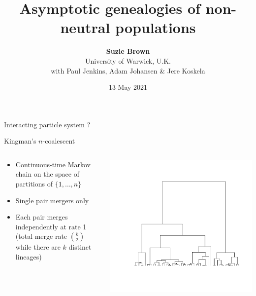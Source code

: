 \documentclass[aspectratio=169]{beamer}
\title[]{Asymptotic genealogies of non-neutral populations}
\author[Suzie Brown]{\textbf{Suzie Brown} \\[5pt] University of Warwick, U.K. \\ with Paul Jenkins, Adam Johansen \& Jere Koskela}
\date{13 May 2021}
\theoremstyle{definition}
\begin{document}
\begin{frame}
\maketitle
\end{frame}


\begin{frame}{Interacting particle system}
?
\end{frame}


\begin{frame}{Kingman's $n$-coalescent}%
\begin{columns}
\begin{column}{0.45\textwidth}
\begin{itemize}
\item Continuous-time Markov chain on the space of partitions of $\{1,\dots,n\}$
\item Single pair mergers only
\item Each pair merges independently at rate 1 (total merge rate $\binom{k}{2}$ while there are $k$ distinct lineages)
\end{itemize}
\end{column}
\begin{column}{0.45\textwidth}
\includegraphics[width=\textwidth, trim={2.8cm 3cm 1.5cm 2cm}, clip]{ncoalescent.pdf}
\end{column}
\end{columns}
\end{frame}
\end{document}
